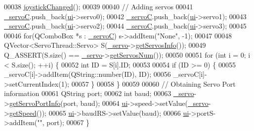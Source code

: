 \begin{DoxyCode}
00038     \hyperlink{a00006_ae8c0373be58da710194f8d14f1c3c4dc}{joystickChanged}();
00039     
00040     \textcolor{comment}{// Adding servos}
00041     \hyperlink{a00006_a45137fbf71bbee10e171019c913b88b7}{\_servoC}.push\_back(\hyperlink{a00006_a8347442d5b3b670e8fff0c4102db1f88}{ui}->servo0);
00042     \hyperlink{a00006_a45137fbf71bbee10e171019c913b88b7}{\_servoC}.push\_back(\hyperlink{a00006_a8347442d5b3b670e8fff0c4102db1f88}{ui}->servo1);
00043     \hyperlink{a00006_a45137fbf71bbee10e171019c913b88b7}{\_servoC}.push\_back(\hyperlink{a00006_a8347442d5b3b670e8fff0c4102db1f88}{ui}->servo2);
00044     \hyperlink{a00006_a45137fbf71bbee10e171019c913b88b7}{\_servoC}.push\_back(\hyperlink{a00006_a8347442d5b3b670e8fff0c4102db1f88}{ui}->servo3);
00045     
00046     \textcolor{keywordflow}{for}(QComboBox *s : \hyperlink{a00006_a45137fbf71bbee10e171019c913b88b7}{\_servoC}) s->addItem(\textcolor{stringliteral}{"None"}, -1);
00047     
00048     QVector<ServoThread::Servo> S(\hyperlink{a00006_acba1566fea3f831000d5e1c1edc3e776}{\_servo}->\hyperlink{a00009_a5fd8ef13314428f5ba7646730cc58f1c}{getServosInfo}());
00049     Q\_ASSERT(S.size() == \hyperlink{a00006_acba1566fea3f831000d5e1c1edc3e776}{\_servo}->\hyperlink{a00009_ad6ead0ac6fce4539d4b0ff5a3e18ac38}{getServosNum}());
00050     
00051     \textcolor{keywordflow}{for} (\textcolor{keywordtype}{int} i = 0; i < S.size(); ++i) \{
00052         \textcolor{keywordtype}{int} ID = S[i].ID;
00053         
00054         \textcolor{keywordflow}{if} (ID >= 0) \{
00055             \_servoC[i]->addItem(QString::number(ID), ID);
00056             \_servoC[i]->setCurrentIndex(1);
00057         \}
00058     \}
00059     
00060     \textcolor{comment}{// Obtaining Servo Port information}
00061     QString port;
00062     \textcolor{keywordtype}{int} baud;
00063     \hyperlink{a00006_acba1566fea3f831000d5e1c1edc3e776}{\_servo}->\hyperlink{a00009_afcf834d93f1ac9663d6ebaab820e5f74}{getServoPortInfo}(port, baud);
00064     \hyperlink{a00006_a8347442d5b3b670e8fff0c4102db1f88}{ui}->speed->setValue(\hyperlink{a00006_acba1566fea3f831000d5e1c1edc3e776}{\_servo}->\hyperlink{a00009_a6af364effc9c52c0acec7d00a2c3d262}{getSpeed}());
00065     \hyperlink{a00006_a8347442d5b3b670e8fff0c4102db1f88}{ui}->baudRS->setValue(baud);
00066     \hyperlink{a00006_a8347442d5b3b670e8fff0c4102db1f88}{ui}->portS->addItem(\textcolor{stringliteral}{""}, port);
00067 \}
\end{DoxyCode}
\hypertarget{a00006_a034c885fe8bb4416e732a9571d14a6b4}{}
